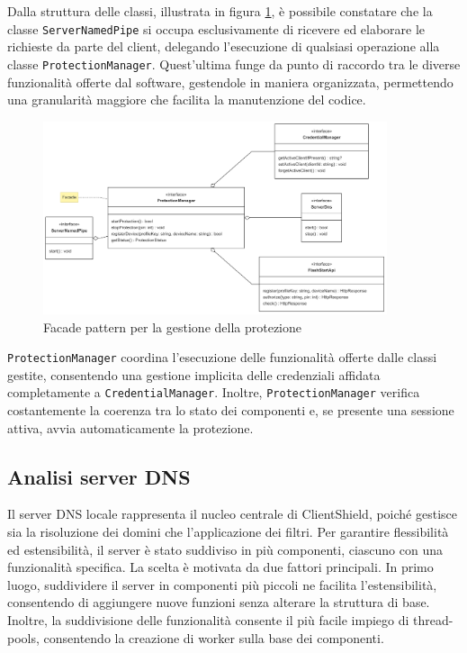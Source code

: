 \documentclass[12pt,a4paper,openright,twoside]{book}
\begin{document}
Dalla struttura delle classi, illustrata in figura \ref{fig:protezione-facade-pattern}, è possibile constatare che la classe \texttt{ServerNamedPipe} si occupa esclusivamente di ricevere ed elaborare le richieste da parte del client, delegando l'esecuzione di qualsiasi operazione alla classe \texttt{ProtectionManager}.
Quest'ultima funge da punto di raccordo tra le diverse funzionalità offerte dal software, gestendole in maniera organizzata, permettendo una granularità maggiore che facilita la manutenzione del codice.
\begin{figure}[h]
	\centering
	\includegraphics[width=0.9\textwidth]{figures/protezione-facade-pattern.png}
	\caption{Facade pattern per la gestione della protezione}
	\label{fig:protezione-facade-pattern}
\end{figure}
\texttt{ProtectionManager} coordina l'esecuzione delle funzionalità offerte dalle classi gestite, consentendo una gestione implicita delle credenziali affidata completamente a \texttt{CredentialManager}.
Inoltre, \texttt{ProtectionManager} verifica costantemente la coerenza tra lo stato dei componenti e, se presente una sessione attiva, avvia automaticamente la protezione.


\subsection{Analisi server DNS}

Il server \gls{DNS} locale rappresenta il nucleo centrale di ClientShield, poiché gestisce sia la risoluzione dei domini che l'applicazione dei filtri.
Per garantire flessibilità ed estensibilità, il server è stato suddiviso in più componenti, ciascuno con una funzionalità specifica.
La scelta è motivata da due fattori principali.
In primo luogo, suddividere il server in componenti più piccoli ne facilita l'estensibilità, consentendo di aggiungere nuove funzioni senza alterare la struttura di base.
Inoltre, la suddivisione delle funzionalità consente il più facile impiego di thread-pools, consentendo la creazione di worker sulla base dei componenti.
\end{document}
